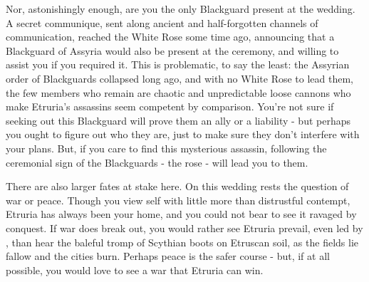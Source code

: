 \documentclass[char]{Kos}
\begin{document}
    Nor, astonishingly enough, are you the only Blackguard present at the wedding. A secret communique, sent along ancient and half-forgotten channels of communication, reached the White Rose some time ago, announcing that a Blackguard of Assyria would also be present at the ceremony, and willing to assist you if you required it. This is problematic, to say the least: the Assyrian order of Blackguards collapsed long ago, and with no White Rose to lead them, the few members who remain are chaotic and unpredictable loose cannons who make Etruria's assassins seem competent by comparison. You're not sure if seeking out this Blackguard will prove them an ally or a liability - but perhaps you ought to figure out who they are, just to make sure they don't interfere with your plans. But, if you care to find this mysterious assassin, following the ceremonial sign of the Blackguards - the rose - will lead you to them.

    There are also larger fates at stake here. On this wedding rests the question of war or peace. Though you view \cEtruriaKing{\Monarch} \cEtruriaKing{} \cEtruriaKing{\them}self with little more than distrustful contempt, Etruria has always been your home, and you could not bear to see it ravaged by conquest. If war does break out, you would rather see Etruria prevail, even led by \cEtruriaKing{}, than hear the baleful tromp of Scythian boots on Etruscan soil, as the fields lie fallow and the cities burn. Perhaps peace is the safer course - but, if at all possible, you would love to see a war that Etruria can win. 
\end{document}
